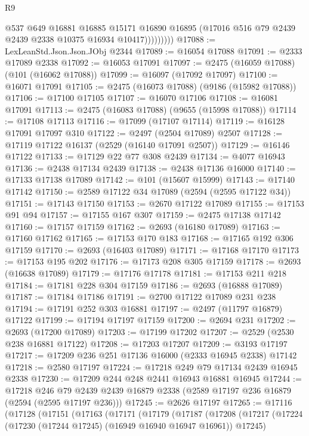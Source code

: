 \begin{lexlean}{R9}
\begin{coremodule}
                    @537
                    @649
                    @16881
                    @16885
                    @15171
                    @16890
                    @16895
                    (@17016 @516 @79 @2439 @2439 @2338 @10375 @16934 @10417)))))))))
@17088 := LexLeanStd.Json.Json.JObj @2344
@17089 := @16054 @17088
@17091 := @2333 @17089 @2338
@17092 := @16053 @17091
@17097 := @2475 (@16059 @17088) (@101 (@16062 @17088))
@17099 := @16097 (@17092 @17097)
@17100 := @16071 @17091
@17105 := @2475 (@16073 @17088) (@9186 (@15982 @17088))
@17106 := @17100 @17105
@17107 := @16070 @17106
@17108 := @16081 @17091
@17113 := @2475 (@16083 @17088) (@9655 (@15998 @17088))
@17114 := @17108 @17113
@17116 := @17099 (@17107 @17114)
@17119 := @16128 @17091 @17097 @310
@17122 := @2497 (@2504 @17089) @2507
@17128 := @17119 @17122 @16137 (@2529 (@16140 @17091 @2507))
@17129 := @16146 @17122
@17133 := @17129 @22 @77 @308 @2439
@17134 := @4077 @16943
@17136 := @2438 @17134 @2439
@17138 := @2438 @17136 @16000
@17140 := @17133 @17138 @17089
@17142 := @101 (@15607 @15999)
@17143 := @17140 @17142
@17150 := @2589 @17122 @34 @17089 (@2594 (@2595 @17122 @34))
@17151 := @17143 @17150
@17153 := @2670 @17122 @17089
@17155 := @17153 @91 @94
@17157 := @17155 @167 @307
@17159 := @2475 @17138 @17142
@17160 := @17157 @17159
@17162 := @2693 (@16180 @17089)
@17163 := @17160 @17162
@17165 := @17153 @170 @183
@17168 := @17165 @192 @306 @17159
@17170 := @2693 (@16403 @17089)
@17171 := @17168 @17170
@17173 := @17153 @195 @202
@17176 := @17173 @208 @305 @17159
@17178 := @2693 (@16638 @17089)
@17179 := @17176 @17178
@17181 := @17153 @211 @218
@17184 := @17181 @228 @304 @17159
@17186 := @2693 (@16888 @17089)
@17187 := @17184 @17186
@17191 := @2700 @17122 @17089 @231 @238
@17194 := @17191 @252 @303 @16881
@17197 := @2497 (@11797 @16879) @17122
@17199 := @17194 @17197 @17159
@17200 := @2694 @231
@17202 := @2693 (@17200 @17089)
@17203 := @17199 @17202
@17207 := @2529 (@2530 @238 @16881 @17122)
@17208 := @17203 @17207
@17209 := @3193 @17197
@17217 := @17209 @236 @251 @17136 @16000 (@2333 @16945 @2338) @17142
@17218 := @2580 @17197
@17224 := @17218 @249 @79 @17134 @2439 @16945 @2338
@17230 := @17209 @244 @248 @2441 @16943 @16881 @16945
@17244 := @17218
    @246
    @79
    @2439
    @2439
    @16879
    @2338
    (@2589 @17197 @236 @16879 (@2594 (@2595 @17197 @236)))
@17245 := @2626 @17197
@17265 := @17116
    (@17128
      (@17151
        (@17163
          (@17171
            (@17179
              (@17187
                (@17208
                  (@17217
                    (@17224 (@17230 (@17244 @17245) (@16949 @16940 @16947 @16961)) @17245)

\end{coremodule}
\end{lexlean}
